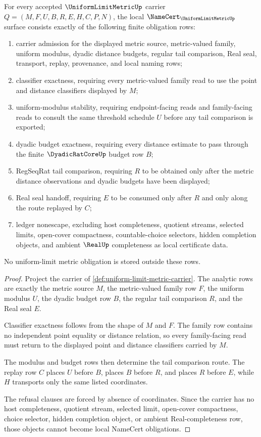 \begin{theorem}
\label{thm:uniform-limit-metric-namecert-obligations}
For every accepted $\UniformLimitMetricUp$ carrier $Q=(M,F,U,B,R,E,H,C,P,N)$, the local $\NameCert_{\UniformLimitMetricUp}$ surface consists exactly of the following finite obligation rows:
\begin{enumerate}
\item carrier admission for the displayed metric source, metric-valued family, uniform modulus, dyadic distance budgets, regular tail comparison, Real seal, transport, replay, provenance, and local naming rows;
\item classifier exactness, requiring every metric-valued family read to use the point and distance classifiers displayed by $M$;
\item uniform-modulus stability, requiring endpoint-facing reads and family-facing reads to consult the same threshold schedule $U$ before any tail comparison is exported;
\item dyadic budget exactness, requiring every distance estimate to pass through the finite $\DyadicRatCoreUp$ budget row $B$;
\item RegSeqRat tail comparison, requiring $R$ to be obtained only after the metric distance observations and dyadic budgets have been displayed;
\item Real seal handoff, requiring $E$ to be consumed only after $R$ and only along the route replayed by $C$;
\item ledger nonescape, excluding host completeness, quotient streams, selected limits, open-cover compactness, countable-choice selectors, hidden completion objects, and ambient $\RealUp$ completeness as local certificate data.
\end{enumerate}
No uniform-limit metric obligation is stored outside these rows.
\end{theorem}
\begin{proof}
Project the carrier of \autoref{def:uniform-limit-metric-carrier}. The analytic rows are exactly the metric source $M$, the metric-valued family row $F$, the uniform modulus $U$, the dyadic budget row $B$, the regular tail comparison $R$, and the Real seal $E$.

Classifier exactness follows from the shape of $M$ and $F$. The family row contains no independent point equality or distance relation, so every family-facing read must return to the displayed point and distance classifiers carried by $M$.

The modulus and budget rows then determine the tail comparison route. The replay row $C$ places $U$ before $B$, places $B$ before $R$, and places $R$ before $E$, while $H$ transports only the same listed coordinates.

The refusal clauses are forced by absence of coordinates. Since the carrier has no host completeness, quotient stream, selected limit, open-cover compactness, choice selector, hidden completion object, or ambient Real-completeness row, those objects cannot become local NameCert obligations.
\end{proof}

